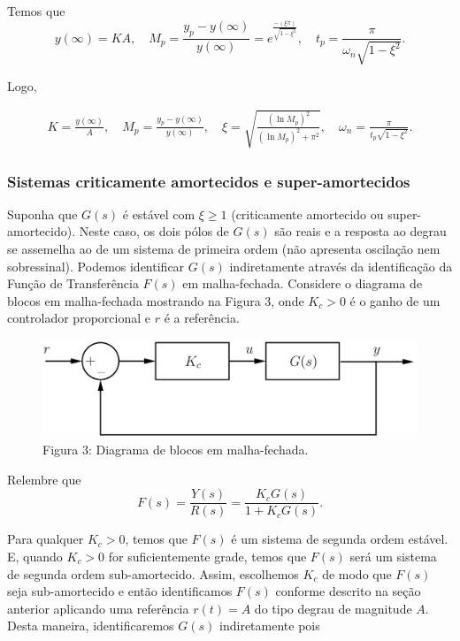 \documentclass[
]{book}
\theoremstyle{definition}
\theoremstyle{definition}
\theoremstyle{definition}
\theoremstyle{remark}
\begin{document}
Temos que
\[
y(\infty) = KA, \quad M_p= \frac {y_p-y(\infty)}{y(\infty)} = e^{\frac {-(\xi \pi)}{\sqrt{1-\xi^2}}}, \quad
t_p = \frac {\pi}{\omega_n\sqrt{1-\xi^2}}.
\]

Logo,

\begin{align}
K = \frac {y(\infty)}{A}, \quad M_p = \frac {y_p - y(\infty)}{y(\infty)}, \quad \xi = \sqrt{\frac {(\ln{M_p})^2}{(\ln{M_p})^2+\pi^2}}, \quad \omega_n = \frac {\pi}{t_p\sqrt{1-\xi^2}}.  \label{eq:eq34}
\end{align}

\hypertarget{sistemas-criticamente-amortecidos-e-super-amortecidos}{%
\subsubsection*{Sistemas criticamente amortecidos e super-amortecidos}\label{sistemas-criticamente-amortecidos-e-super-amortecidos}}

Suponha que \(G(s)\) é estável com \(\xi \geq 1\) (criticamente amortecido ou super-amortecido). Neste caso, os dois pólos de \(G(s)\) são reais e a resposta ao degrau se assemelha ao de um sistema de primeira ordem (não apresenta oscilação nem sobressinal). Podemos identificar \(G(s)\) indiretamente através da identificação da Função de Transferência \(F(s)\) em malha-fechada. Considere o diagrama de blocos em malha-fechada mostrando na Figura 3, onde \(K_c > 0\) é o ganho de um controlador proporcional e \(r\) é a referência.

\begin{figure}
\centering
\includegraphics{Imagens/Lab3/Explicação/fig3.jpg}
\caption{Figura 3: Diagrama de blocos em malha-fechada.}
\end{figure}

Relembre que
\[
F(s) = \frac {Y(s)}{R(s)} = \frac {K_cG(s)}{1+K_cG(s)}.
\]

Para qualquer \(K_c > 0\), temos que \(F(s)\) é um sistema de segunda ordem estável. E, quando \(K_c > 0\) for suficientemente grade, temos que \(F(s)\) será um sistema de segunda ordem sub-amortecido. Assim, escolhemos \(K_c\) de modo que \(F(s)\) seja sub-amortecido e então identificamos \(F(s)\) conforme descrito na seção anterior aplicando uma referência \(r(t) = A\) do tipo degrau de magnitude \(A\). Desta maneira, identificaremos \(G(s)\) indiretamente pois
\end{document}
